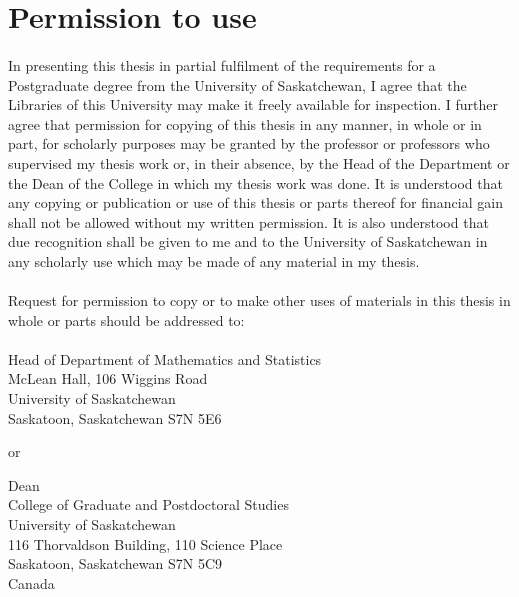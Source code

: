 \section*{Permission to use}
    \paragraph*{}
        In presenting this thesis in partial fulfilment of the requirements for a Postgraduate degree from the University of Saskatchewan, I agree that the Libraries of this University may make it freely available for inspection. I further agree that permission for copying of this thesis in any manner, in whole or in part, for scholarly purposes may be granted by the professor or professors who supervised my thesis work or, in their absence, by the Head of the Department or the Dean of the College in which my thesis work was done. It is understood that any copying or publication or use of this thesis or parts thereof for financial gain shall not be allowed without my written permission. It is also understood that due recognition shall be given to me and to the University of Saskatchewan in any scholarly use which may be made of any material in my thesis.

    \paragraph*{}
        Request for permission to copy or to make other uses of materials in this thesis in whole or parts should be addressed to:

    \paragraph*{}
        \begingroup
            \raggedright Head of Department of Mathematics and Statistics
            \\
            McLean Hall, 106 Wiggins Road
            \\
            University of Saskatchewan
            \\
            Saskatoon, Saskatchewan S7N 5E6
        \endgroup
    
        or
    
        \begingroup
            \raggedright Dean
            \\
            College of Graduate and Postdoctoral Studies
            \\
            University of Saskatchewan
            \\
            116 Thorvaldson Building, 110 Science Place
            \\
            Saskatoon, Saskatchewan  S7N 5C9
            \\
            Canada
        \endgroup